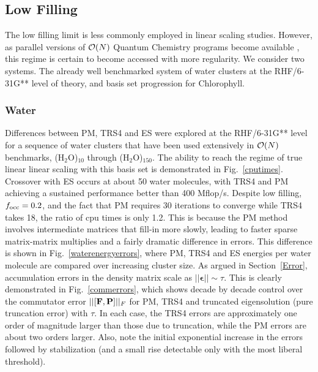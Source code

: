 \commentoutA{\documentclass[prl,aps,twocolumn,showpacs,twocolumngrid,superbib]{revtex4}}
\begin{document}
\subsection{Low Filling}

The low filling limit is less commonly employed in linear scaling studies.  However, as parallel versions
of ${\cal O}(N)$ Quantum Chemistry programs become available \cite{MChallacombe00B,CGan03}, this regime 
is certain to become accessed with more regularity.  We consider two systems.  The already well benchmarked 
system of water clusters at the RHF/6-31G** level of theory, and basis set progression for Chlorophyll.

\subsubsection{Water}

Differences between PM, TRS4 and ES were explored at the RHF/6-31G** level for a sequence 
of water clusters that have been used extensively in ${\cal O}(N)$ benchmarks\cite{MChallacombe96,MChallacombe96A,MChallacombe97,JBurant96,ESchwegler97,JMillam97,ADaniels97,COchsenfeld98,ESchwegler99}, (H$_2$O)$_{10}$ through (H$_2$O)$_{150}$.
The ability to reach the regime 
of true linear linear scaling with this basis set is demonstrated in Fig.~\ref{cputimes}.
Crossover with ES occurs at about 50 water molecules, with {\sc TRS4} and {\sc PM} achieving a sustained 
performance better than 400 Mflop/s.  Despite low filling, $f_{\rm occ}=0.2$, and the fact that PM 
requires 30 iterations to converge while TRS4 takes 18, the ratio of cpu times is only 1.2.  
This is because the PM method involves intermediate matrices that fill-in more slowly, leading to 
faster sparse matrix-matrix multiplies and a fairly dramatic difference in errors.  
This difference is shown in Fig.~\ref{waterenergyerrors}, where PM, TRS4 and ES energies per water molecule 
are compared over increasing cluster size.  As argued in Section~\ref{Error}, accumulation errors 
in the density matrix scale as $||{\bm\epsilon}||\sim \tau$. This is clearly demonstrated in 
Fig.~\ref{commerrors}, which shows decade by decade control over the commutator error 
$||[{\bf F,P}]||_F$ for PM, TRS4 and truncated eigensolution (pure truncation error) with $\tau$. 
In each case, the TRS4 errors are approximately one order of magnitude larger than those due to 
truncation, while the PM errors are about two orders larger.  Also, note the initial exponential  
increase in the errors followed by stabilization (and a small rise detectable only with the 
most liberal threshold).
\end{document}
